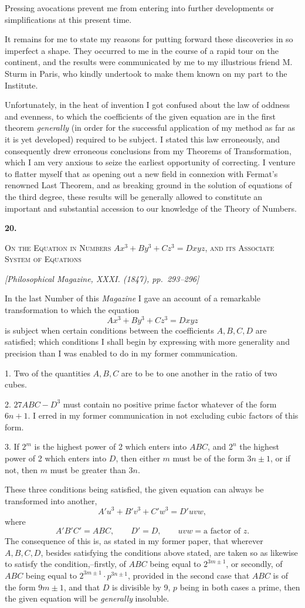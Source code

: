 \documentclass[11pt]{article}
\newcommand{\paperhead}[3]{%
  \clearpage
  \begin{center}
  {\Large\bfseries #1.}\par\vspace{0.85em}
  {\large\scshape #2}\par\vspace{0.6em}
  {\itshape [#3]}\par
  \end{center}\vspace{0.4em}}
\newcommand{\sourcepage}[1]{\marginpar{\scriptsize p.~#1}}
\begin{document}
Pressing avocations prevent me from entering into further developments or simplifications at this present time.

It remains for me to state my reasons for putting forward these discoveries in so imperfect a shape. They occurred to me in the course of a rapid tour on the continent, and the results were communicated by me to my illustrious friend M. Sturm in Paris, who kindly undertook to make them known on my part to the Institute.

Unfortunately, in the heat of invention I got confused about the law of oddness and evenness, to which the coefficients of the given equation are in the first theorem \emph{generally} (in order for the successful application of my method as far as it is yet developed) required to be subject. I stated this law erroneously, and consequently drew erroneous conclusions from my Theorems of Transformation, which I am very anxious to seize the earliest opportunity of correcting. I venture to flatter myself that as opening out a new field in connexion with Fermat's renowned Last Theorem, and as breaking ground in the solution of equations of the third degree, these results will be generally allowed to constitute an important and substantial accession to our knowledge of the Theory of Numbers.

\paperhead{20}{On the Equation in Numbers $Ax^3+By^3+Cz^3=Dxyz$, and its Associate System of Equations}{Philosophical Magazine, XXXI. (1847), pp.~293--296}

\sourcepage{110}
In the last Number of this \emph{Magazine} I gave an account of a remarkable transformation to which the equation
\[
Ax^3+By^3+Cz^3=Dxyz
\]
is subject when certain conditions between the coefficients $A,B,C,D$ are satisfied; which conditions I shall begin by expressing with more generality and precision than I was enabled to do in my former communication.

1. Two of the quantities $A,B,C$ are to be to one another in the ratio of two cubes.

2. $27ABC-D^3$ must contain no positive prime factor whatever of the form $6n+1$. I erred in my former communication in not excluding cubic factors of this form.

3. If $2^m$ is the highest power of 2 which enters into $ABC$, and $2^n$ the highest power of 2 which enters into $D$, then either $m$ must be of the form $3n\pm1$, or if not, then $m$ must be greater than $3n$.

These three conditions being satisfied, the given equation can always be transformed into another,
\[
A'u^3+B'v^3+C'w^3=D'uvw,
\]
where
\[
A'B'C'=ABC,\qquad D'=D,\qquad uvw=\text{a factor of }z.
\]
The consequence of this is, as stated in my former paper, that wherever $A,B,C,D$, besides satisfying the conditions above stated, are taken so as likewise to satisfy the condition,--firstly, of $ABC$ being equal to $2^{3m\pm1}$, or secondly, of $ABC$ being equal to $2^{3m\pm1}\cdot p^{3n\pm1}$, provided in the second case that $ABC$ is of the form $9m\pm1$, and that $D$ is divisible by 9, $p$ being in both cases a prime, then the given equation will be \emph{generally} insoluble.
\end{document}
